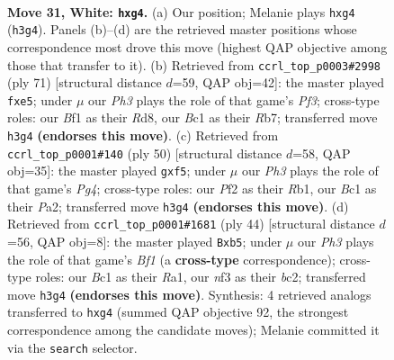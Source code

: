 \documentclass[11pt]{article}
\begin{document}
\clearpage

\begin{figure}[p]\centering
\begin{subfigure}{0.46\textwidth}\centering
\resizebox{\linewidth}{!}{%
\newchessgame
\chessboard[
  setfen={1r1r4/pb1p1pk1/8/2R1p3/6p1/5n1P/PP3P2/2BK1B1R w - - 0 31},
  showmover=false,
  pgfstyle=straightmove, color=movearrow, markmove={h3-g4}
]}
\caption{}
\end{subfigure}\hfill
\begin{subfigure}{0.46\textwidth}\centering
\resizebox{\linewidth}{!}{%
\newchessgame
\chessboard[
  setfen={3r2k1/1r4bp/5pp1/3pP3/3N1P2/6P1/7P/3R1R1K b - - 1 36},
  showmover=false,
  pgfstyle=straightmove, color=movearrow, markmove={f6-e5}
]}
\caption{}
\end{subfigure}
\\[4pt]
\begin{subfigure}{0.46\textwidth}\centering
\resizebox{\linewidth}{!}{%
\newchessgame
\chessboard[
  setfen={r2r3k/1p4pp/np6/5p2/2B3P1/5R2/PP5P/1R5K w - - 2 26},
  showmover=false,
  pgfstyle=straightmove, color=movearrow, markmove={g4-f5}
]}
\caption{}
\end{subfigure}\hfill
\begin{subfigure}{0.46\textwidth}\centering
\resizebox{\linewidth}{!}{%
\newchessgame
\chessboard[
  setfen={2r4r/4kppp/8/1p6/8/P3P3/2b3PP/R3KB1R w K - 0 23},
  showmover=false,
  pgfstyle=straightmove, color=movearrow, markmove={f1-b5}
]}
\caption{}
\end{subfigure}
\caption{\textbf{Move 31, White: \texttt{hxg4}.} (a) Our position; Melanie plays \texttt{hxg4} (\texttt{h3g4}). Panels (b)--(d) are the retrieved master positions whose correspondence most drove this move (highest QAP objective among those that transfer to it). (b) Retrieved from \texttt{ccrl\_top\_p0003\#2998} (ply 71) [structural distance $d$=59, QAP obj=42]: the master played \texttt{fxe5}; under $\mu$ our \emph{Ph3} plays the role of that game's \emph{Pf3}; cross-type roles: our \emph{B}f1 as their \emph{R}d8, our \emph{B}c1 as their \emph{R}b7; transferred move \texttt{h3g4} \textbf{(endorses this move)}. (c) Retrieved from \texttt{ccrl\_top\_p0001\#140} (ply 50) [structural distance $d$=58, QAP obj=35]: the master played \texttt{gxf5}; under $\mu$ our \emph{Ph3} plays the role of that game's \emph{Pg4}; cross-type roles: our \emph{P}f2 as their \emph{R}b1, our \emph{B}c1 as their \emph{P}a2; transferred move \texttt{h3g4} \textbf{(endorses this move)}. (d) Retrieved from \texttt{ccrl\_top\_p0001\#1681} (ply 44) [structural distance $d$=56, QAP obj=8]: the master played \texttt{Bxb5}; under $\mu$ our \emph{Ph3} plays the role of that game's \emph{Bf1} (a \textbf{cross-type} correspondence); cross-type roles: our \emph{B}c1 as their \emph{R}a1, our \emph{n}f3 as their \emph{b}c2; transferred move \texttt{h3g4} \textbf{(endorses this move)}. Synthesis: 4 retrieved analogs transferred to \texttt{hxg4} (summed QAP objective 92, the strongest correspondence among the candidate moves); Melanie committed it via the \texttt{search} selector.}
\label{fig:thought-m60}
\end{figure}
\end{document}
